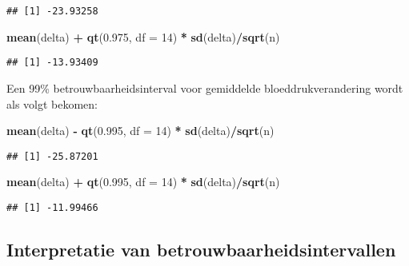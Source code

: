 \documentclass[
  12pt,dutch,coursenotes]{book}
\newenvironment{Shaded}{\begin{snugshade}}{\end{snugshade}}
\newcommand{\DataTypeTok}[1]{\textcolor[rgb]{0.13,0.29,0.53}{#1}}
\newcommand{\DecValTok}[1]{\textcolor[rgb]{0.00,0.00,0.81}{#1}}
\newcommand{\FloatTok}[1]{\textcolor[rgb]{0.00,0.00,0.81}{#1}}
\newcommand{\KeywordTok}[1]{\textcolor[rgb]{0.13,0.29,0.53}{\textbf{#1}}}
\newcommand{\NormalTok}[1]{#1}
\newcommand{\OperatorTok}[1]{\textcolor[rgb]{0.81,0.36,0.00}{\textbf{#1}}}
\newcommand{\StringTok}[1]{\textcolor[rgb]{0.31,0.60,0.02}{#1}}
\theoremstyle{definition}
\theoremstyle{definition}
\theoremstyle{definition}
\theoremstyle{remark}
\begin{document}
\begin{verbatim}
## [1] -23.93258
\end{verbatim}

\begin{Shaded}
\begin{Highlighting}[]
\KeywordTok{mean}\NormalTok{(delta) }\OperatorTok{+}\StringTok{ }\KeywordTok{qt}\NormalTok{(}\FloatTok{0.975}\NormalTok{, }\DataTypeTok{df =} \DecValTok{14}\NormalTok{) }\OperatorTok{*}\StringTok{ }\KeywordTok{sd}\NormalTok{(delta)}\OperatorTok{/}\KeywordTok{sqrt}\NormalTok{(n)}
\end{Highlighting}
\end{Shaded}

\begin{verbatim}
## [1] -13.93409
\end{verbatim}

Een 99\% betrouwbaarheidsinterval voor gemiddelde bloeddrukverandering wordt als volgt bekomen:

\begin{Shaded}
\begin{Highlighting}[]
\KeywordTok{mean}\NormalTok{(delta) }\OperatorTok{{-}}\StringTok{ }\KeywordTok{qt}\NormalTok{(}\FloatTok{0.995}\NormalTok{, }\DataTypeTok{df =} \DecValTok{14}\NormalTok{) }\OperatorTok{*}\StringTok{ }\KeywordTok{sd}\NormalTok{(delta)}\OperatorTok{/}\KeywordTok{sqrt}\NormalTok{(n)}
\end{Highlighting}
\end{Shaded}

\begin{verbatim}
## [1] -25.87201
\end{verbatim}

\begin{Shaded}
\begin{Highlighting}[]
\KeywordTok{mean}\NormalTok{(delta) }\OperatorTok{+}\StringTok{ }\KeywordTok{qt}\NormalTok{(}\FloatTok{0.995}\NormalTok{, }\DataTypeTok{df =} \DecValTok{14}\NormalTok{) }\OperatorTok{*}\StringTok{ }\KeywordTok{sd}\NormalTok{(delta)}\OperatorTok{/}\KeywordTok{sqrt}\NormalTok{(n)}
\end{Highlighting}
\end{Shaded}

\begin{verbatim}
## [1] -11.99466
\end{verbatim}

\hypertarget{subsec:interpretBI}{%
\subsection{Interpretatie van betrouwbaarheidsintervallen}\label{subsec:interpretBI}}
\end{document}
